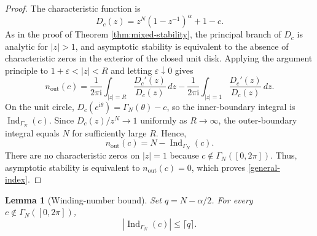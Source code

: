 \documentclass[11pt,a4paper]{article}
\newtheorem{Lem}[thm]{Lemma}
\theoremstyle{definition}
\begin{document}
\begin{proof}
The characteristic function is
\begin{equation*}
D_c(z)=z^N(1-z^{-1})^\alpha+1-c.
\end{equation*}
As in the proof of Theorem \ref{thm:mixed-stability}, the principal branch of $D_c$ is analytic for $|z|>1$, and asymptotic stability is equivalent to the absence of characteristic zeros in the exterior of the closed unit disk. Applying the argument principle to $1+\varepsilon<|z|<R$ and letting $\varepsilon\downarrow0$ gives
\begin{equation*}
n_{\mathrm{out}}(c)
=\frac{1}{2\pi\mathrm{i}}\int_{|z|=R}\frac{D_c'(z)}{D_c(z)}\,dz
-\frac{1}{2\pi\mathrm{i}}\int_{|z|=1}\frac{D_c'(z)}{D_c(z)}\,dz.
\end{equation*}
On the unit circle, $D_c(e^{\mathrm{i}\theta})=\Gamma_N(\theta)-c$, so the inner-boundary integral is $\operatorname{Ind}_{\Gamma_N}(c)$. Since $D_c(z)/z^N\to1$ uniformly as $R\to\infty$, the outer-boundary integral equals $N$ for sufficiently large $R$. Hence,
\begin{equation*}
n_{\mathrm{out}}(c)=N-\operatorname{Ind}_{\Gamma_N}(c).
\end{equation*}
There are no characteristic zeros on $|z|=1$ because $c\notin\Gamma_N([0,2\pi])$. Thus, asymptotic stability is equivalent to $n_{\mathrm{out}}(c)=0$, which proves \eqref{general-index}.
\end{proof}

\begin{Lem}[Winding-number bound]\label{lem:winding-bound}
Set $q=N-\alpha/2$. For every $c\notin\Gamma_N([0,2\pi])$,
\begin{equation}\label{index-bound}
\left|\operatorname{Ind}_{\Gamma_N}(c)\right|\leq\lceil q\rceil.
\end{equation}
\end{Lem}
\end{document}
